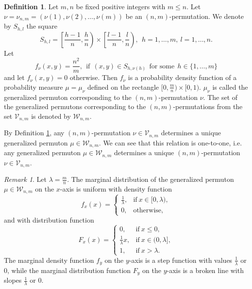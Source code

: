 \documentclass[12pt,twoside]{article}
\theoremstyle{definition}
\newtheorem{definition}[theorem]{Definition}
\theoremstyle{remark}
\numberwithin{equation}{section}
\theoremstyle{plain}
\theoremstyle{remark}
\newtheorem{rem}{Remark}[section]
\def\VD{{\mathcal V}}
\def\WD{{\mathcal W}}
\begin{document}
\begin{definition} \label{W}
Let $m,n$ be fixed positive integers with $m\le n$.
Let $\nu= \nu_{n,m} =(\nu(1), \nu(2), \dots , \nu(m))$ be an $(n,m)$-permutation.
We denote by $S_{h,l}$ the square
\begin{equation}  \label{Shl}
S_{h,l}= \left[\frac{h-1}{n}, \frac{h}{n} \right) \times  \left[\frac{l-1}{n}, \frac{l}{n} \right), \ \
h=1,\dots,m, \ l=1,\dots,n.
\end{equation}
Let 
\begin{equation}  \label{fnu}
f_\nu (x,y) = \frac{n^2}{m}, \ \ \text{if} \ \ (x,y)\in  S_{h,\nu(h)} \ \ \text{for some} \ \ 
h\in \{ 1, \dots , m \}
\end{equation}
and let $f_\nu (x,y) =0$ otherwise.
Then $f_\nu$ is a probability density function of a probability measure $\mu= \mu_\nu$ 
defined on the rectangle $[0, \frac{m}{n})\times [0, 1)$.
$\mu_\nu$ is called the generalized permuton corresponding to the $(n,m)$-permutation $\nu$.
The set of the generalized permutons corresponding to the $(n,m)$-permutations 
from the set $\VD_{n,m}$ is denoted by $\WD_{n,m}$.
\end{definition}
%

By Definition \ref{W}, any $(n,m)$-permutation $\nu \in \VD_{n,m}$ determines a unique 
generalized permuton $\mu \in \WD_{n,m}$.
We can see that this relation is one-to-one, i.e.
any generalized permuton $\mu \in \WD_{n,m}$ determines a unique $(n,m)$-permutation $\nu \in \VD_{n,m}$.
%

\begin{rem}
Let $\lambda = \frac{m}{n}$.
The marginal distribution of the generalized permuton $\mu \in \WD_{n,m}$ 
on the $x$-axis is uniform with density function 
$$
f_x(x) =\begin{cases} \frac{1}{\lambda},  & \text{if} \  x\in [0, \lambda) , \\
                      0, & \text{otherwise}, 
                      \end{cases}
$$
and with distribution function 
$$
F_x(x) =\begin{cases} 0, & \text{if} \ x\le 0, \\
                       \frac{1}{\lambda}x,& \text{if} \  x\in (0, \lambda] , \\
                      1, & \text{if} \ x> \lambda  .
                      \end{cases}
$$
The marginal density function $f_y$ on the $y$-axis is a step function with values $\frac{1}{\lambda}$ or
$0$, 
while the marginal distribution function $F_y$ on the $y$-axis is a broken line
with slopes $\frac{1}{\lambda}$ or $0$.
\end{rem}
%
\end{document}
